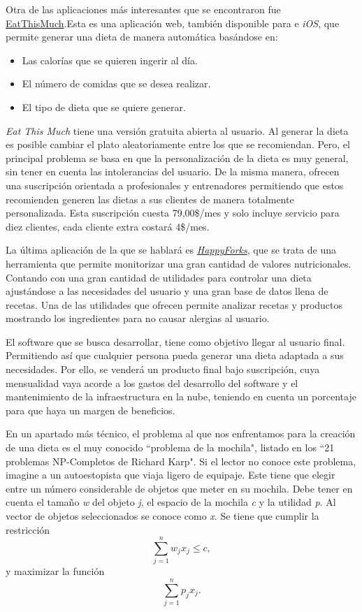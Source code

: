 Otra de las aplicaciones más interesantes que se encontraron fue \href{https://www.eatthismuch.com/}{EatThisMuch}.Esta es una aplicación web, también disponible para  e \emph{iOS}, que permite generar una dieta de manera automática basándose en:
\begin{itemize}
    \item Las calorías que se quieren ingerir al día.
    \item El número de comidas que se desea realizar.
    \item El tipo de dieta que se quiere generar.
\end{itemize}
\emph{Eat This Much} tiene una versión gratuita abierta al usuario. Al generar la dieta es posible cambiar el plato aleatoriamente entre los que se recomiendan. Pero, el principal problema se basa en que la personalización de la dieta es muy general, sin tener en cuenta las intolerancias del usuario. De la misma manera, ofrecen una suscripción orientada a profesionales y entrenadores permitiendo que estos recomienden generen las dietas a sus clientes de manera totalmente personalizada. Esta suscripción cuesta 79,00\$/mes y solo incluye servicio para diez clientes, cada cliente extra costará 4\$/mes. 

La última aplicación de la que se hablará es \href{https://happyforks.com/}{\emph{HappyForks}}, que se trata de una herramienta que permite monitorizar una gran cantidad de valores nutricionales. Contando con una gran cantidad de utilidades para controlar una dieta ajustándose a las necesidades del usuario y una gran base de datos llena de recetas. Una de las utilidades que ofrecen permite analizar recetas y productos mostrando los ingredientes para no causar alergias al usuario. 

El software que se busca desarrollar, tiene como objetivo llegar al usuario final. Permitiendo así que cualquier persona pueda generar una dieta adaptada a sus necesidades. Por ello, se venderá un producto final bajo suscripción, cuya mensualidad vaya acorde a los gastos del desarrollo del software y el mantenimiento de la infraestructura en la nube, teniendo en cuenta un porcentaje para que haya un margen de beneficios.

En un apartado más técnico, el problema al que nos enfrentamos para la creación de una dieta es el muy conocido ``problema de la mochila", listado en los ``21 problemas NP-Completos de Richard Karp". Si el lector no conoce este problema, imagine a un autoestopista que viaja ligero de equipaje. Este tiene que elegir entre un número considerable de objetos que meter en su mochila. Debe tener en cuenta el tamaño \emph{w} del objeto \emph{j}, el espacio de la mochila \emph{c} y la utilidad \emph{p}. Al vector de objetos seleccionados se conoce como \emph{x}. Se tiene que cumplir la restricción
\begin{equation}
    \sum_{j=1}^{n}w_{j}x_{j} \leq c,
\end{equation}
y maximizar la función
\begin{equation}
    \sum_{j=1}^{n}p_{j}x_{j}.
\end{equation}

